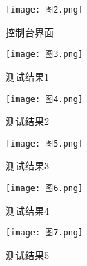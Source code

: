 \documentclass{article}
\begin{document}
\begin{figure}[ht] %

    \centering

    \texttt{[image: 图2.png]}
    
    \caption{控制台界面}
    
    \label{fig:b}
    
\end{figure}

\begin{figure}[ht] %

    \centering
    
    \texttt{[image: 图3.png]}
    
    \caption{测试结果1}
    
    \label{fig:c}
    
\end{figure}
    
\begin{figure}[ht] %
    
    \centering
    
    \texttt{[image: 图4.png]}
        
    \caption{测试结果2}
        
    \label{fig:d}
        
\end{figure}

\begin{figure}[ht] %
    
    \centering
    
    \texttt{[image: 图5.png]}
        
    \caption{测试结果3}
        
    \label{fig:e}
        
\end{figure}

\begin{figure}[ht] %
    
    \centering
    
    \texttt{[image: 图6.png]}
        
    \caption{测试结果4}
        
    \label{fig:f}
        
\end{figure}

\begin{figure}[ht] %
    
    \centering
    
    \texttt{[image: 图7.png]}
        
    \caption{测试结果5}
        
    \label{fig:g}
        
\end{figure}
\end{document}
